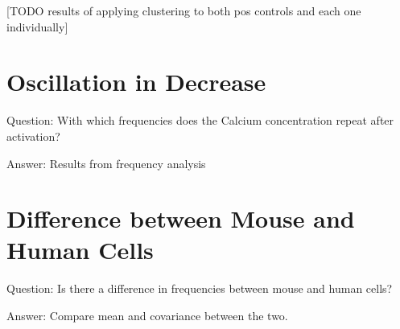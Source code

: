 [TODO results of applying clustering to both pos controls and each one individually]

\section{Oscillation in Decrease}

Question: With which frequencies does the Calcium concentration repeat after activation?

Answer: Results from frequency analysis

\section{Difference between Mouse and Human Cells}
\label{sec:differences_between_mouse_and_human_cells}

Question: Is there a difference in frequencies between mouse and human cells?

Answer: Compare mean and covariance between the two.